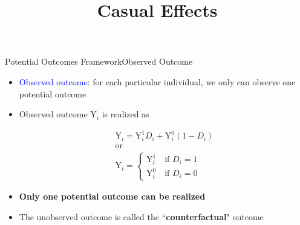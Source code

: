 \documentclass[hyperref={pdfpagelabels=false}]{beamer}
\begin{document}
\begin{frame}{Potential Outcomes Framework}{Observed Outcome}

\begin{itemize} 
\item \textcolor{blue}{Observed outcome}: for each particular individual, we only can observe one potential outcome
\vspace{0.2cm}
\item Observed outcome $\mathrm{Y}_i$ is realized as 

\begin{gather*}
	\mathrm{Y}_i = \mathrm{Y}^{1}_{i}D_i+\mathrm{Y}^{0}_{i}(1-D_i) \\
	\text{or} \\
	\mathrm{Y}_i = \left\lbrace
	\begin{array}{l}
		\mathrm{Y}^{1}_{i}\quad \text{if $D_i=1$} \\
		\mathrm{Y}^{0}_{i}\quad \text{if $D_i=0$}
	\end{array} \right.
\end{gather*}


\item \textbf{Only one potential outcome can be realized}	
\vspace{0.2cm}
\item The unobserved outcome is called the ``\textbf{counterfactual}" outcome
\end{itemize}

\end{frame}








\title[]  
{Casual Effects}


\author 
{}

\institute{}
\end{document}
